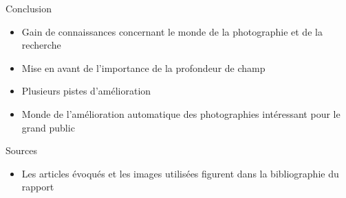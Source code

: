 \documentclass{beamer}
\begin{document}
\begin{frame}{Conclusion}
\begin{itemize}
\item Gain de connaissances concernant le monde de la photographie et de la recherche 
\item Mise en avant de l'importance de la profondeur de champ
\item Plusieurs pistes d'amélioration 
\item Monde de l'amélioration automatique des photographies intéressant pour le grand public
\end{itemize}
\end{frame}

\begin{frame}{Sources}
\begin{itemize}
\item Les articles évoqués et les images utilisées figurent dans la bibliographie du rapport 
\end{itemize}
\end{frame}
\end{document}
